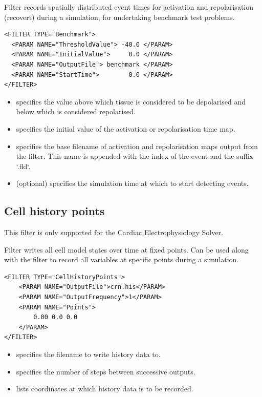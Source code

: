 Filter  records spatially distributed event times for 
    activation and repolarisation (recovert) during a simulation, for
    undertaking benchmark test problems.
\begin{lstlisting}[style=XmlStyle]
<FILTER TYPE="Benchmark">
  <PARAM NAME="ThresholdValue"> -40.0 </PARAM>
  <PARAM NAME="InitialValue">     0.0 </PARAM>
  <PARAM NAME="OutputFile"> benchmark </PARAM>
  <PARAM NAME="StartTime">        0.0 </PARAM>
</FILTER>
\end{lstlisting}
    \begin{itemize}
        \item {} specifies the value above which tissue is
            considered to be depolarised and below which is considered
            repolarised.
        \item {} specifies the initial value of the
            activation or repolarisation time map.
        \item {} specifies the base filename of activation and
            repolarisation maps output from the filter. This name is appended
            with the index of the event and the suffix `.fld`.
        \item {} (optional) specifies the simulation time at
            which to start detecting events.
    \end{itemize}


\subsection{Cell history points}\label{filters:CellHistoryPoints}

\begin{notebox}
  This filter is only supported for the Cardiac Electrophysiology Solver.
\end{notebox}

Filter  writes all cell model states over time at
  fixed points. Can be used along with the  filter to
  record all variables at specific points during a simulation.
\begin{lstlisting}[style=XmlStyle]
<FILTER TYPE="CellHistoryPoints">
    <PARAM NAME="OutputFile">crn.his</PARAM>
    <PARAM NAME="OutputFrequency">1</PARAM>
    <PARAM NAME="Points">
        0.00 0.0 0.0
    </PARAM>
</FILTER>
\end{lstlisting}
    \begin{itemize}
        \item {} specifies the filename to write history data to.
        \item {} specifies the number of steps between successive outputs.
        \item {} lists coordinates at which history data is to be recorded.
    \end{itemize}

